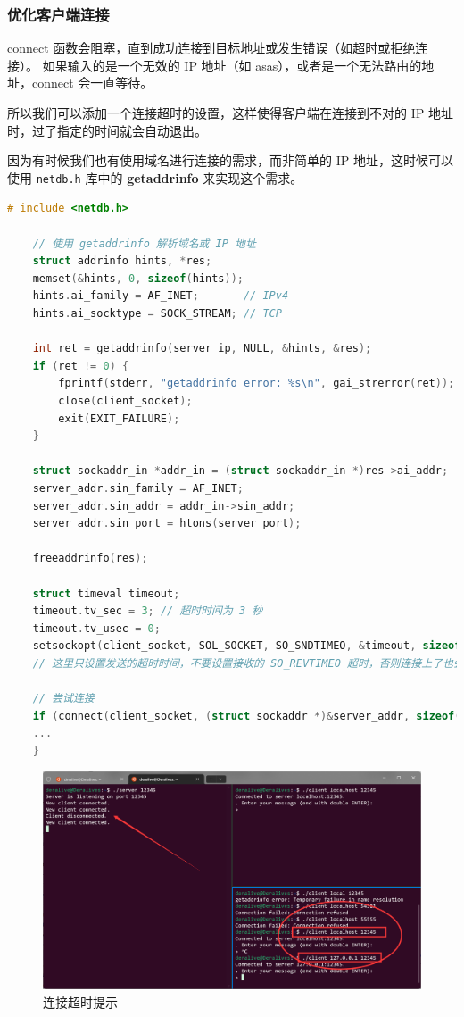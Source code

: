 \documentclass[14pt,a4paper,UTF8,twoside]{article}
\begin{document}
\subsubsection{优化客户端连接}

connect 函数会阻塞，直到成功连接到目标地址或发生错误（如超时或拒绝连接）。
如果输入的是一个无效的 IP 地址（如 asas），或者是一个无法路由的地址，connect 会一直等待。

所以我们可以添加一个连接超时的设置，这样使得客户端在连接到不对的 IP 地址时，过了指定的时间就会自动退出。

因为有时候我们也有使用域名进行连接的需求，而非简单的 IP 地址，这时候可以使用 \texttt{netdb.h} 库中的 \textbf{getaddrinfo} 来实现这个需求。

\begin{lstlisting}[language=C, title={Connect}]
    # include <netdb.h>

    // 使用 getaddrinfo 解析域名或 IP 地址
    struct addrinfo hints, *res;
    memset(&hints, 0, sizeof(hints));
    hints.ai_family = AF_INET;       // IPv4
    hints.ai_socktype = SOCK_STREAM; // TCP

    int ret = getaddrinfo(server_ip, NULL, &hints, &res);
    if (ret != 0) {
        fprintf(stderr, "getaddrinfo error: %s\n", gai_strerror(ret));
        close(client_socket);
        exit(EXIT_FAILURE);
    }

    struct sockaddr_in *addr_in = (struct sockaddr_in *)res->ai_addr;
    server_addr.sin_family = AF_INET;
    server_addr.sin_addr = addr_in->sin_addr;
    server_addr.sin_port = htons(server_port);

    freeaddrinfo(res);

    struct timeval timeout;
    timeout.tv_sec = 3; // 超时时间为 3 秒
    timeout.tv_usec = 0;
    setsockopt(client_socket, SOL_SOCKET, SO_SNDTIMEO, &timeout, sizeof(timeout));
    // 这里只设置发送的超时时间，不要设置接收的 SO_REVTIMEO 超时，否则连接上了也会断开

    // 尝试连接
    if (connect(client_socket, (struct sockaddr *)&server_addr, sizeof(server_addr)) < 0) {
    ...
    }
\end{lstlisting}

\begin{figure}[H]
    \centering
    \includegraphics[width=0.9\linewidth]{lab7/addr.png}
    \caption{连接超时提示}
    \label{fig:timeout}
\end{figure}
\end{document}
